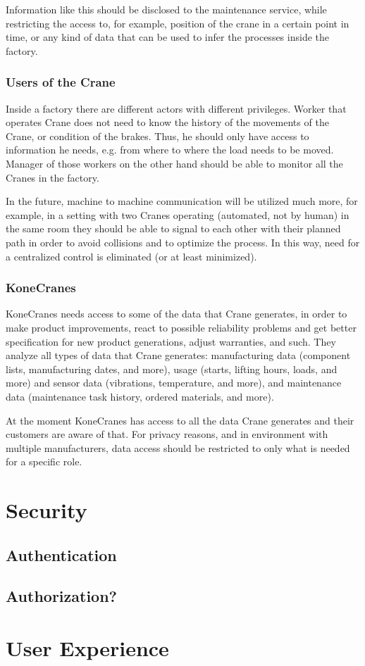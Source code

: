 Information like this should be disclosed to the maintenance service, while
restricting the access to, for example, position of the crane in a certain
point in time, or any kind of data that can be used to infer the processes
inside the factory.

\subsubsection{Users of the Crane}

Inside a factory there are different actors with different privileges. Worker that
operates Crane does not need to know the history of the movements of the Crane, or 
condition of the brakes. Thus, he should only have access to information he needs, e.g. 
from where to where the load needs to be moved.
Manager of those workers on the other hand should be able to monitor all the Cranes in
the factory.

In the future, machine to machine communication will be utilized much more, for example, 
in a setting with two Cranes operating (automated, not by human) in the same room they 
should be able to signal to each other with their planned path in order to avoid collisions
and to optimize the process. In this way, need for a centralized control is eliminated (or at
least minimized).

\subsubsection{KoneCranes}

KoneCranes needs access to some of the data that Crane generates, in order to make product improvements, react to possible reliability problems and get better specification for new product generations, adjust warranties, and such.
They analyze all types of data that Crane generates: manufacturing data (component lists, manufacturing dates, and more), usage (starts, lifting hours, loads, and more) and sensor data (vibrations, temperature, and more), and maintenance data (maintenance task history, ordered materials, and more).

At the moment KoneCranes has access to all the data Crane generates and their customers are aware
of that. For privacy reasons, and in environment with multiple manufacturers, data access should be restricted to only what is needed for a specific role. 

\section{Security}

\subsection{Authentication}


\subsection{Authorization?}

\section{User Experience}

